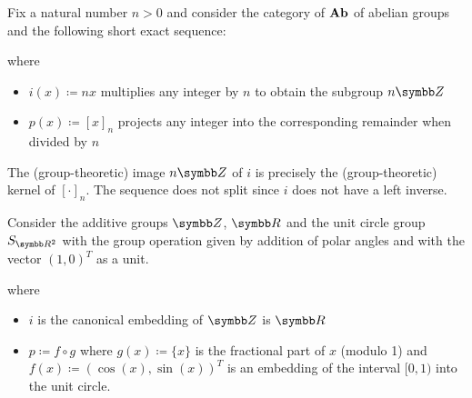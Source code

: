 \begin{example}\label{ex:short_exact_sequences}
  \mbox{}
  \begin{defenum}
    \item\label{ex:short_exact_sequences/cyclic_groups} Fix a natural number \( n > 0 \) and consider the category of \( \operatorname{\mathbf{Ab}} \) of abelian groups and the following short exact sequence:
    \begin{Center}
    \end{Center}
    where
    \begin{itemize}
      \item \( i(x) \coloneqq nx \) multiplies any integer by \( n \) to obtain the subgroup \( n \BB{Z} \)
      \item \( p(x) \coloneqq [x]_n \) projects any integer into the corresponding remainder when divided by \( n \)
    \end{itemize}

    The (group-theoretic) image \( n \BB{Z} \) of \( i \) is precisely the (group-theoretic) kernel of \( [\cdot]_n \). The sequence does not split since \( i \) does not have a left inverse.

    \item\label{ex:short_exact_sequences/real_number_splitting} Consider the additive groups \( \BB{Z} \), \( \BB{R} \) and the unit circle group \( S_{\BB{R}^2} \) with the group operation given by addition of polar angles and with the vector \( (1, 0)^T \) as a unit.
    \begin{Center}
    \end{Center}
    where
    \begin{itemize}
      \item \( i \) is the canonical embedding of \( \BB{Z} \) is \( \BB{R} \)
      \item \( p \coloneqq f \circ g \) where \( g(x) \coloneqq \{ x \} \) is the fractional part of \( x \) (modulo 1) and \( f(x) \coloneqq (\cos(x), \sin(x))^T \) is an embedding of the interval \( [0, 1) \) into the unit circle.
    \end{itemize}


\end{defenum}
\end{example}
